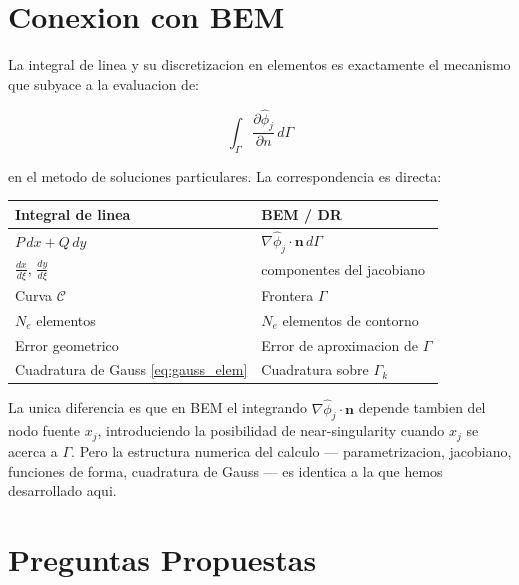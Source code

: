 \documentclass[12pt,a4paper]{article}
\begin{document}
\section{Conexion con BEM}

La integral de linea y su discretizacion en elementos es exactamente el
mecanismo que subyace a la evaluacion de:

\begin{equation}
    \int_\Gamma \frac{\partial\hat\phi_j}{\partial n}\, d\Gamma
\end{equation}

en el metodo de soluciones particulares. La correspondencia es directa:

\begin{center}
\begin{tabular}{ll}
\toprule
Integral de linea & BEM / DR \\
\midrule
$P\,dx + Q\,dy$ & $\nabla\hat\phi_j\cdot\mathbf{n}\,d\Gamma$ \\
$\frac{dx}{d\xi},\,\frac{dy}{d\xi}$ & componentes del jacobiano \\
Curva $\mathcal{C}$ & Frontera $\Gamma$ \\
$N_e$ elementos & $N_e$ elementos de contorno \\
Error geometrico & Error de aproximacion de $\Gamma$ \\
Cuadratura de Gauss \eqref{eq:gauss_elem} & Cuadratura sobre $\Gamma_k$ \\
\bottomrule
\end{tabular}
\end{center}

La unica diferencia es que en BEM el integrando $\nabla\hat\phi_j\cdot\mathbf{n}$
depende tambien del nodo fuente $x_j$, introduciendo la posibilidad de
near-singularity cuando $x_j$ se acerca a $\Gamma$. Pero la estructura
numerica del calculo --- parametrizacion, jacobiano, funciones de forma,
cuadratura de Gauss --- es identica a la que hemos desarrollado aqui.

\section{Preguntas Propuestas}
\end{document}
